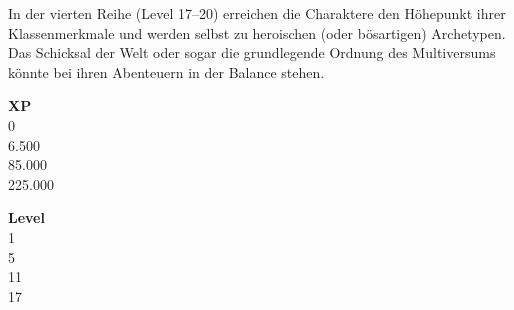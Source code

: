 In der vierten Reihe (Level 17–20) erreichen die Charaktere den Höhepunkt ihrer Klassenmerkmale und werden selbst zu heroischen (oder bösartigen) Archetypen. Das Schicksal der Welt oder sogar die grundlegende Ordnung des Multiversums könnte bei ihren Abenteuern in der Balance stehen.
\newline
{}\newline
\begin{minipage}{.2\linewidth}
	\begin{dndtable}
	   	\textbf{XP} \\
			0    \\
			6.500      \\
			85.000      \\
			225.000   
	\end{dndtable}
\end{minipage}
\begin{minipage}{.2\linewidth}
	\begin{dndtable}
	   	\textbf{Level} \\
			1   \newline
			4 \\
			5     \newline
			10 \\
			11     \newline
			16 \\
			17   \newline
			20
	\end{dndtable}
\end{minipage}
